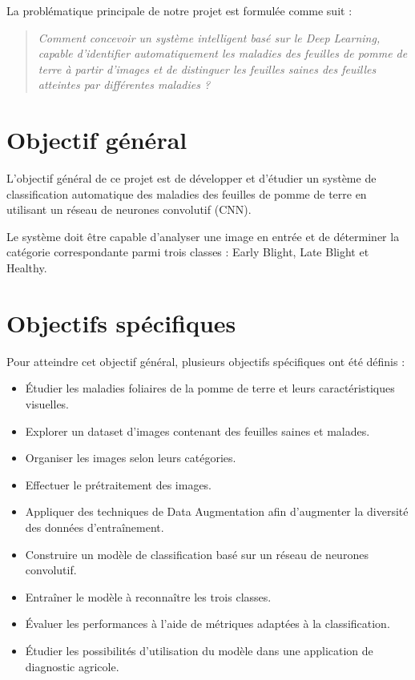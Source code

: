 \documentclass[12pt,a4paper,oneside]{report}
\begin{document}
La problématique principale de notre projet est formulée
comme suit :

\begin{quote}
\textit{Comment concevoir un système intelligent basé sur
le Deep Learning, capable d'identifier automatiquement
les maladies des feuilles de pomme de terre à partir
d'images et de distinguer les feuilles saines des feuilles
atteintes par différentes maladies ?}
\end{quote}

\section{Objectif général}

L'objectif général de ce projet est de développer et d'étudier
un système de classification automatique des maladies
des feuilles de pomme de terre en utilisant un réseau
de neurones convolutif (CNN).

Le système doit être capable d'analyser une image en entrée
et de déterminer la catégorie correspondante parmi trois
classes : Early Blight, Late Blight et Healthy.

\section{Objectifs spécifiques}

Pour atteindre cet objectif général, plusieurs objectifs
spécifiques ont été définis :

\begin{itemize}
    \item Étudier les maladies foliaires de la pomme de terre
    et leurs caractéristiques visuelles.
    \item Explorer un dataset d'images contenant des feuilles
    saines et malades.
    \item Organiser les images selon leurs catégories.
    \item Effectuer le prétraitement des images.
    \item Appliquer des techniques de Data Augmentation
    afin d'augmenter la diversité des données d'entraînement.
    \item Construire un modèle de classification basé sur
    un réseau de neurones convolutif.
    \item Entraîner le modèle à reconnaître les trois classes.
    \item Évaluer les performances à l'aide de métriques
    adaptées à la classification.
    \item Étudier les possibilités d'utilisation du modèle
    dans une application de diagnostic agricole.
\end{itemize}
\end{document}
